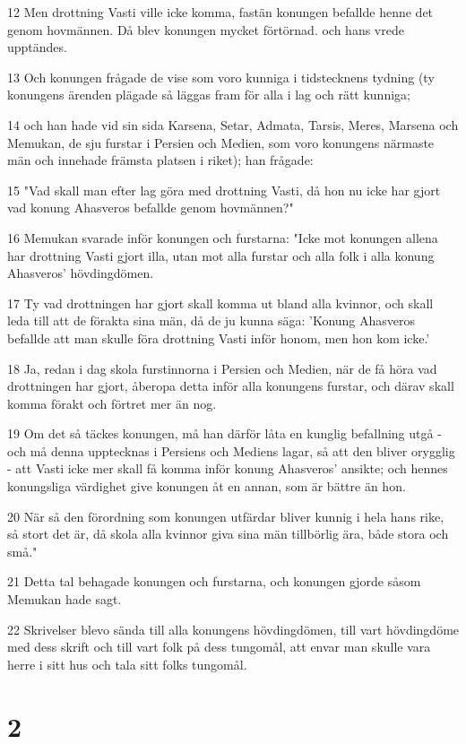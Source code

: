 \par 12 Men drottning Vasti ville icke komma, fastän konungen befallde henne det genom hovmännen. Då blev konungen mycket förtörnad. och hans vrede upptändes.
\par 13 Och konungen frågade de vise som voro kunniga i tidstecknens tydning (ty konungens ärenden plägade så läggas fram för alla i lag och rätt kunniga;
\par 14 och han hade vid sin sida Karsena, Setar, Admata, Tarsis, Meres, Marsena och Memukan, de sju furstar i Persien och Medien, som voro konungens närmaste män och innehade främsta platsen i riket); han frågade:
\par 15 "Vad skall man efter lag göra med drottning Vasti, då hon nu icke har gjort vad konung Ahasveros befallde genom hovmännen?"
\par 16 Memukan svarade inför konungen och furstarna: "Icke mot konungen allena har drottning Vasti gjort illa, utan mot alla furstar och alla folk i alla konung Ahasveros' hövdingdömen.
\par 17 Ty vad drottningen har gjort skall komma ut bland alla kvinnor, och skall leda till att de förakta sina män, då de ju kunna säga: 'Konung Ahasveros befallde att man skulle föra drottning Vasti inför honom, men hon kom icke.'
\par 18 Ja, redan i dag skola furstinnorna i Persien och Medien, när de få höra vad drottningen har gjort, åberopa detta inför alla konungens furstar, och därav skall komma förakt och förtret mer än nog.
\par 19 Om det så täckes konungen, må han därför låta en kunglig befallning utgå - och må denna upptecknas i Persiens och Mediens lagar, så att den bliver orygglig - att Vasti icke mer skall få komma inför konung Ahasveros' ansikte; och hennes konungsliga värdighet give konungen åt en annan, som är bättre än hon.
\par 20 När så den förordning som konungen utfärdar bliver kunnig i hela hans rike, så stort det är, då skola alla kvinnor giva sina män tillbörlig ära, både stora och små."
\par 21 Detta tal behagade konungen och furstarna, och konungen gjorde såsom Memukan hade sagt.
\par 22 Skrivelser blevo sända till alla konungens hövdingdömen, till vart hövdingdöme med dess skrift och till vart folk på dess tungomål, att envar man skulle vara herre i sitt hus och tala sitt folks tungomål.

\chapter{2}

